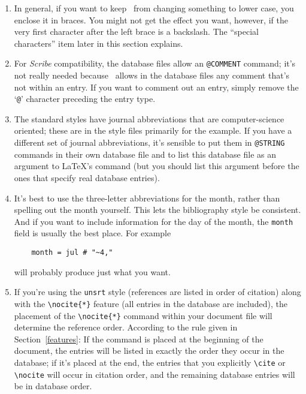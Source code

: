 \begin{enumerate}
\item
In general, if you want to keep \BibTeX\ from changing
something to lower case, you enclose it in braces.
You might not get the effect you want, however,
if the very first character after the left brace is a backslash.
The ``special characters'' item later in this section explains.

\item
For {\em Scribe\/} compatibility, the database files
allow an \hbox{\tt @COMMENT} command; it's not really
needed because \BibTeX\ allows in the database files
any comment that's not within an entry.
If you want to comment out an entry,
simply remove the `{\tt @}' character preceding the entry type.

\item
The standard styles have journal abbreviations that are
computer-science oriented;
these are in the style files primarily for the example.
If you have a different set of journal abbreviations,
it's sensible to put them in \hbox{\tt @STRING} commands
in their own database file and to list this database file
as an argument to \LaTeX's \hbox{\verb||} command
(but you should list this argument before the ones that
specify real database entries).

\item
It's best to use the three-letter abbreviations for the month,
rather than spelling out the month yourself.
This lets the bibliography style be consistent.
And if you want to include information for the day of the month,
the {\tt month} field is usually the best place.
For example
\begin{verbatim}
    month = jul # "~4,"
\end{verbatim}
will probably produce just what you want.

\item
If you're using the \hbox{\tt unsrt} style
(references are listed in order of citation)
along with the \hbox{\verb|\nocite{*}|} feature
(all entries in the database are included),
the placement of the \hbox{\verb|\nocite{*}|} command
within your document file will determine the reference order.
According to the rule given in Section~\ref{features}:
If the command is placed at the beginning of the document,
the entries will be listed in exactly the order
they occur in the database;
if it's placed at the end,
the entries that you explicitly
\hbox{\verb|\cite|} or \hbox{\verb|\nocite|}
will occur in citation order,
and the remaining database entries will be in database order.


\end{enumerate}

